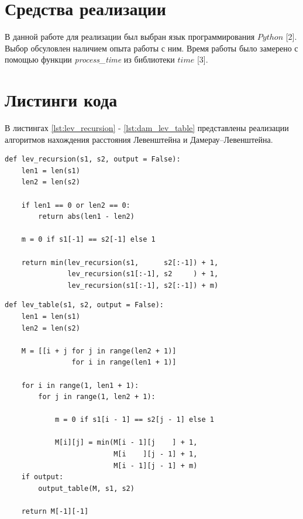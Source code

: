 \documentclass[a4paper,14pt, unknownkeysallowed]{extreport}
\begin{document}
\section{Средства реализации}
В данной работе для реализации был выбран язык программирования $Python$ [2]. Выбор обсуловлен наличием опыта работы с ним. Время работы было замерено с помощью функции \textit{process\_time} из библиотеки $time$ [3].





\section{Листинги кода}

В листингах \ref{lst:lev_recursion} - \ref{lst:dam_lev_table} представлены реализации алгоритмов нахождения расстояния Левенштейна и Дамерау–Левенштейна.

\clearpage

\begin{center}
\captionsetup{justification=raggedright,singlelinecheck=off}
\begin{lstlisting}[label=lst:lev_recursion,caption=Функция нахождения расстояния Левенштейна рекурсивно]
def lev_recursion(s1, s2, output = False):
    len1 = len(s1)
    len2 = len(s2)

    if len1 == 0 or len2 == 0:
        return abs(len1 - len2)

    m = 0 if s1[-1] == s2[-1] else 1

    return min(lev_recursion(s1,      s2[:-1]) + 1,
               lev_recursion(s1[:-1], s2     ) + 1,
               lev_recursion(s1[:-1], s2[:-1]) + m)
\end{lstlisting}
\end{center}


\begin{center}
\captionsetup{justification=raggedright,singlelinecheck=off}
\begin{lstlisting}[label=lst:lev_table,caption=Функция нахождения расстояния Левенштейна итеративно]
def lev_table(s1, s2, output = False):
    len1 = len(s1)
    len2 = len(s2)

    M = [[i + j for j in range(len2 + 1)] 
                for i in range(len1 + 1)]

    for i in range(1, len1 + 1):
        for j in range(1, len2 + 1):

            m = 0 if s1[i - 1] == s2[j - 1] else 1

            M[i][j] = min(M[i - 1][j    ] + 1,
                          M[i    ][j - 1] + 1,
                          M[i - 1][j - 1] + m)
    if output:  
        output_table(M, s1, s2)

    return M[-1][-1]
\end{lstlisting}
\end{center}
\end{document}
